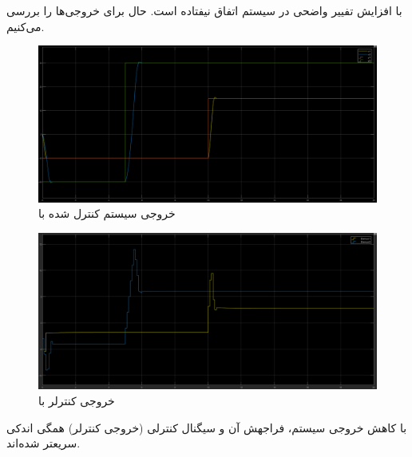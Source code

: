 \documentclass[14pt, a4paper]{extarticle}
\begin{document}
با افزایش 
تفییر واضحی در سیستم اتفاق نیفتاده است.
\newpage
حال برای 
خروجی‌ها را بررسی می‌کنیم.\\
\begin{figure}[h!]
	\centering
	\includegraphics[scale = 0.3]{Q2_sim_result_ph5.png}
	\caption{خروجی سیستم کنترل شده با
		}
\end{figure}
\begin{figure}[h!]
	\centering
	\includegraphics[scale = 0.3]{Q2_sim_control_ph5.png}
	\caption{خروجی کنترلر با
		}
\end{figure}

با کاهش 
خروجی سیستم، فراجهش آن و سیگنال کنترلی (خروجی کنترلر) همگی اندکی سریعتر شده‌اند.

\newpage
\end{document}
